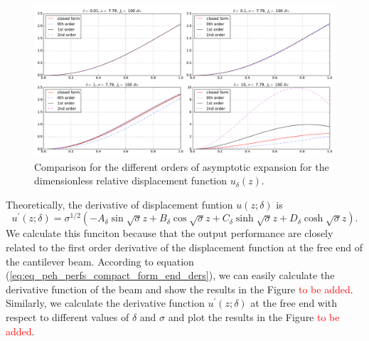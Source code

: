 \documentclass{article}
\begin{document}
\begin{figure}[!htbp]
    \centering
    \includegraphics[width=\textwidth]{./img_eig_asy/fig_sol_analytic_disp_cmp_fr100}
    \caption{Comparison for the different orders of asymptotic expansion for the dimensionless relative displacement function $u_\delta(z)$.}
    \label{fig:fig_sol_analytic_disp_cmp_fr100}
\end{figure}


Theoretically, the derivative of displacement funtion $u(z;\delta)$ is 
\begin{equation}
    u^{\prime}(z;\delta) = \sigma^{1/2} \left( - A_\delta \sin{\sqrt{\sigma}z} + B_\delta \cos{\sqrt{\sigma}z} + C_\delta \sinh{\sqrt{\sigma}z} + D_\delta \cosh{\sqrt{\sigma}z} \right).
\end{equation}
We calculate this funciton because that the output performance are closely related to the first order derivative of the displacement function at the free end of the cantilever beam. According to equation (\ref{eq:eq_peh_perfs_compact_form_end_ders}), we can easily calculate the derivative function of the beam and show the results in the Figure \textcolor{red}{to be added}. Similarly, we calculate the derivative function $u^{\prime}(z;\delta)$ at the free end with respect to different values of $\delta$ and $\sigma$ and plot the results in the Figure \textcolor{red}{to be added}. 
\end{document}
